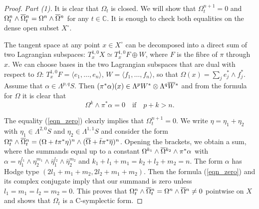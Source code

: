 \documentclass[10pt]{amsart}
\newcommand{\bbC}{\mathbb{C}}
\newcommand{\wdg}{\wedge}
\begin{document}
\begin{proof}
{\it Part (1).} It is clear that $\Omega_t$ is closed. We will show that $\Omega_t^{n+1} = 0$
and $\Omega_t^n\wedge\overline{\Omega}\mathstrut_t^n = \Omega^n\wedge\overline{\Omega}\mathstrut^n$
for any $t\in \bbC$. It is enough to check both equalities on the dense open subset $X^\circ$.

The tangent space at any point $x\in X^\circ$ can be decomposed into a direct sum
of two Lagrangian subspaces: $T_x^{1,0}X \simeq T^{1,0}_x F \oplus W$, where $F$ is the
fibre of $\pi$ through $x$. We can choose bases in the two Lagrangian subspaces that are dual
with respect to $\Omega$: $T^{1,0}_x F = \langle e_1,\ldots,e_n\rangle$, $W = \langle f_1,\ldots,f_n\rangle$,
so that $\Omega(x) = \sum_j e_j^*\wdg f_j^*$.
Assume that $\alpha\in \Lambda^{p,q} S$. Then $(\pi^*\alpha)(x) \in \Lambda^pW^*\otimes \Lambda^q\overline{W}\mathstrut^*$
and from the formula for $\Omega$ it is clear that
\begin{equation}\label{eqn_zero}
\Omega^k\wdg \pi^*\alpha = 0 \quad\mbox{if}\quad p+k > n.
\end{equation}

The equality (\ref{eqn_zero}) clearly implies that $\Omega_t^{n+1} =0$.
We write $\eta = \eta_1 + \eta_2$ with $\eta_1\in\Lambda^{2,0}S$ and $\eta_2\in \Lambda^{1,1}S$ and consider the
form $\Omega_t^n\wedge\overline{\Omega}\mathstrut_t^n = (\Omega + t\pi^*\eta)^n\wedge(\overline{\Omega} + \bar{t}\pi^*\overline{\eta})^n$.
Opening the brackets, we obtain a sum, where the summands equal up to a constant
$\Omega^{k_1} \wedge \overline{\Omega}\mathstrut^{k_2} \wedge \pi^*\alpha$
with $\alpha = \eta_1^{l_1} \wedge \eta_2^{m_1} \wedge \bar{\eta}_1^{l_2} \wedge \bar{\eta}_2^{m_2}$
and $k_1+l_1+m_1 = k_2 + l_2 + m_2 = n$. The form $\alpha$
has Hodge type $(2l_1 + m_1 + m_2, 2l_2 + m_1 + m_2)$. Then the formula (\ref{eqn_zero})
and its complex conjugate imply that our summand is zero unless $l_1=m_1=l_2=m_2=0$.
This proves that $\Omega_t^n\wedge\overline{\Omega}\mathstrut_t^n = \Omega^n\wedge\overline{\Omega}\mathstrut^n\neq 0$
pointwise on $X$ and shows that $\Omega_t$ is a C-symplectic form.


\end{proof}
\end{document}

